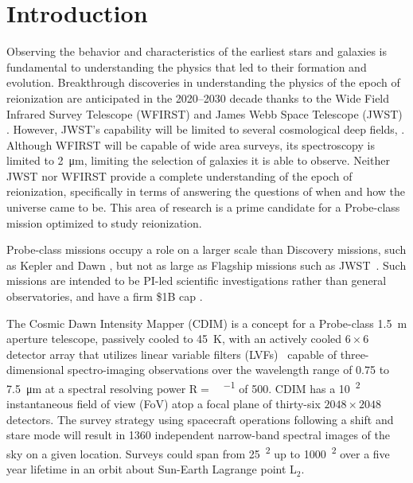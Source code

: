 \documentclass{ws-jai}
\begin{document}
\section{Introduction}
\label{sec:introduction}
Observing the behavior and characteristics of the earliest stars and galaxies is fundamental to understanding the physics that led to their formation and evolution.
Breakthrough discoveries in understanding the physics of the epoch of reionization are anticipated in the 2020--2030 decade thanks to the Wide Field Infrared Survey Telescope (WFIRST) \red{[REF]} and James Webb Space Telescope (JWST) \red{[REF]}.
However, JWST's capability will be limited to several cosmological deep fields, .
Although WFIRST will be capable of wide area surveys, its spectroscopy is limited to \SI{2}{\micro\meter}, limiting the selection of galaxies it is able to observe.
Neither JWST nor WFIRST provide a complete understanding of the epoch of reionization, specifically in terms of answering the questions of when and how the universe came to be. \red{[REF?]}
This area of research is a prime candidate for a Probe-class mission optimized to study reionization.


Probe-class missions occupy a role on a larger scale than Discovery missions, such as Kepler and Dawn \red{[REF]}, but not as large as Flagship missions such as JWST~\cite{probeclasswp}.
Such missions are intended to be PI-led scientific investigations rather than general observatories, and have a firm \$1B cap \red{[REF]}.

The Cosmic Dawn Intensity Mapper (CDIM) is a concept for a Probe-class \SI{1.5}{\meter} aperture telescope, passively cooled to \SI{45}{\kelvin}, with an actively cooled $6\times6$ detector array that utilizes linear variable filters (LVFs)~\cite{cooray2016cdim2page} capable of three-dimensional spectro-imaging observations over the wavelength range of 0.75 to \SI{7.5}{\micro\meter} at a spectral resolving power R$=$\si{\Delta\lambda\per\lambda} of 500.
CDIM has a \SI{10}{\deg\squared} instantaneous field of view (FoV) atop a focal plane of thirty-six $2048\times2048$ detectors.
The survey strategy using spacecraft operations following a shift and stare mode will result in 1360 independent narrow-band spectral images of the sky on a given location.
Surveys could span from \SI{25}{\deg\squared} up to \SI{1000}{\deg\squared} over a five year lifetime in an orbit about Sun-Earth Lagrange point L$_{2}$\@.
\end{document}
